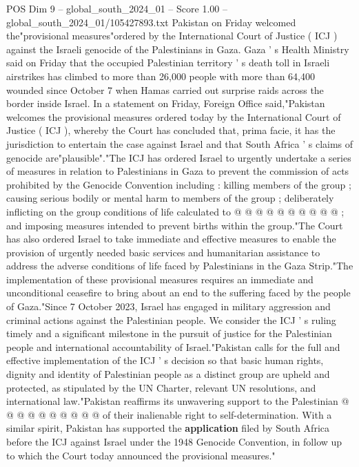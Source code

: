 \begin{textsample}{POS Dim 9 – global\_south\_2024\_01 – Score 1.00 – global\_south\_2024\_01/105427893.txt}  \label{ex:f9_pos_020}
Pakistan on Friday welcomed the"provisional measures"ordered by the International Court of Justice ( ICJ ) against the Israeli genocide of the Palestinians in Gaza.
Gaza ' s Health Ministry said on Friday that the occupied Palestinian territory ' s death toll in Israeli airstrikes has climbed to more than 26,000 people with more than 64,400 wounded since October 7 when Hamas carried out surprise raids across the border inside Israel.
In a statement on Friday, Foreign Office said,"Pakistan welcomes the provisional measures ordered today by the International Court of Justice ( ICJ ), whereby the Court has concluded that, prima facie, it has the jurisdiction to entertain the case against Israel and that South Africa ' s claims of genocide are"plausible"."The ICJ has ordered Israel to urgently undertake a series of measures in relation to Palestinians in Gaza to prevent the commission of acts prohibited by the Genocide Convention including : killing members of the group ; causing serious bodily or mental harm to members of the group ; deliberately inflicting on the group conditions of life calculated to @ @ @ @ @ @ @ @ @ @ ; and imposing measures intended to prevent births within the group."The Court has also ordered Israel to take immediate and effective measures to enable the provision of urgently needed basic services and humanitarian assistance to address the adverse conditions of life faced by Palestinians in the Gaza Strip."The implementation of these provisional measures requires an immediate and unconditional ceasefire to bring about an end to the suffering faced by the people of Gaza."Since 7 October 2023, Israel has engaged in military aggression and criminal actions against the Palestinian people.
We consider the ICJ ' s ruling timely and a significant milestone in the pursuit of justice for the Palestinian people and international accountability of Israel."Pakistan calls for the full and effective implementation of the ICJ ' s decision so that basic human rights, dignity and identity of Palestinian people as a distinct group are upheld and protected, as stipulated by the UN Charter, relevant UN resolutions, and international law."Pakistan reaffirms its unwavering support to the Palestinian @ @ @ @ @ @ @ @ @ @ of their inalienable right to self-determination.
With a similar spirit, Pakistan has supported the \textbf{application} filed by South Africa before the ICJ against Israel under the 1948 Genocide Convention, in follow up to which the Court today announced the provisional measures."

\end{textsample}
